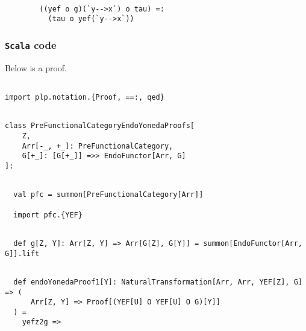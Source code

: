 \documentclass[11pt]{article}
\newcommand{\code}{\subsubsection{{\tt Scala} code}\begingroup\rm \vspace{12pt}}
\def\edefn{\endgroup\par\pagebreak[2]\addvspace{\medskipamount}}
\let\ecode=\edefn
\begin{document}
\vspace{6pt}
\begin{mdframed}[backgroundcolor=lightgray!20] 
\begin{lstlisting}        

        ((yef o g)(`y-->x`) o tau) =:
          (tau o yef(`y-->x`))
\end{lstlisting}
\end{mdframed}    
\ecode

\code
Below is a proof.

\vspace{6pt}
\begin{mdframed}[backgroundcolor=lightgray!20] 
\begin{lstlisting}

import plp.notation.{Proof, ==:, qed}
\end{lstlisting}
\end{mdframed}
\vspace{6pt}
\begin{mdframed}[backgroundcolor=lightgray!20] 
\begin{lstlisting}

class PreFunctionalCategoryEndoYonedaProofs[
    Z,
    Arr[-_, +_]: PreFunctionalCategory,
    G[+_]: [G[+_]] =>> EndoFunctor[Arr, G]
]:

\end{lstlisting}
\end{mdframed}
\vspace{6pt}
\begin{mdframed}[backgroundcolor=lightgray!20] 
\begin{lstlisting}

  val pfc = summon[PreFunctionalCategory[Arr]]

  import pfc.{YEF}
\end{lstlisting}
\end{mdframed}
\vspace{6pt}
\begin{mdframed}[backgroundcolor=lightgray!20] 
\begin{lstlisting}

  def g[Z, Y]: Arr[Z, Y] => Arr[G[Z], G[Y]] = summon[EndoFunctor[Arr, G]].lift

\end{lstlisting}
\end{mdframed}
\vspace{6pt}
\begin{mdframed}[backgroundcolor=lightgray!20] 
\begin{lstlisting}

  def endoYonedaProof1[Y]: NaturalTransformation[Arr, Arr, YEF[Z], G] => (
      Arr[Z, Y] => Proof[(YEF[U] O YEF[U] O G)[Y]]
  ) =
    yefz2g =>
\end{lstlisting}
\end{mdframed}
\end{document}

